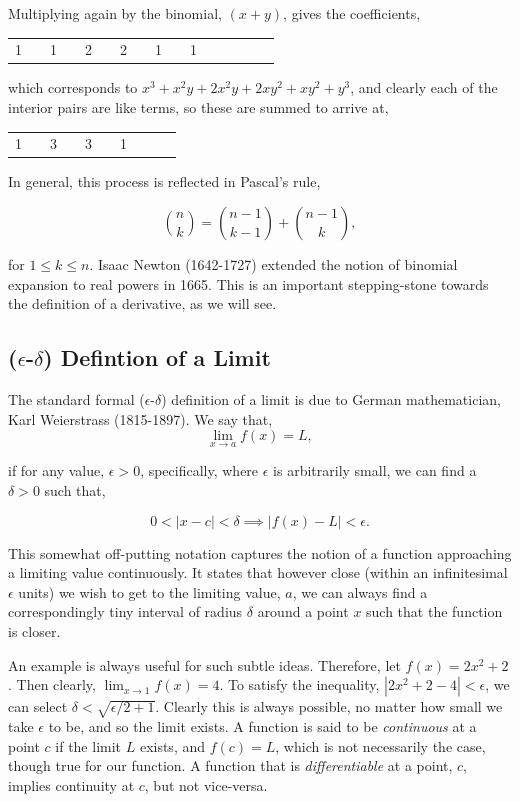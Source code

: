 \documentclass[11pt]{amsart}
\begin{document}
Multiplying again by the binomial, $(x + y)$, gives the coefficients,

\begin{center}
\begin{tabular}{cccccccccccccccc}
1&&1&&2&&2&&1&&1 \\
\end{tabular}
\end{center}

which corresponds to $x^3 + x^2y + 2x^2y + 2xy^2 + xy^2 + y^3$, and clearly each of the interior pairs are like terms, so these are summed to arrive at,

\begin{center}
\begin{tabular}{cccccccccc}
1&&3&&3&&1 \\
\end{tabular}
\end{center}

In general, this process is reflected in Pascal's rule,

$${{n}\choose{k}} = {{n-1}\choose{k-1}} + {{n-1}\choose{k}},$$
		
for $1 \leq k \leq n$. Isaac Newton (1642-1727) extended the notion of binomial expansion to real powers in 1665. This is an important stepping-stone towards the definition of a derivative, as we will see.

\subsection{($\epsilon$-$\delta$) Defintion of a Limit}

The standard formal ($\epsilon$-$\delta$) definition of a limit is due to German mathematician, Karl Weierstrass (1815-1897). We say that, $$\lim_{x \to a} f(x) = L,$$

if for any value, $\epsilon > 0$, specifically, where $\epsilon$ is arbitrarily small, we can find a $\delta > 0$ such that,

$$0 < |x - c| < \delta \implies |f(x) - L| < \epsilon.$$

This somewhat off-putting notation captures the notion of a function approaching a limiting value continuously. It states that however close (within an infinitesimal $\epsilon$ units) we wish to get to the limiting value, $a$, we can always find a correspondingly tiny interval of radius $\delta$ around a point $x$ such that the function is closer.

An example is always useful for such subtle ideas. Therefore, let $f(x) = 2x^2 + 2$. Then clearly, $\lim_{x \to 1} f(x) = 4$. To satisfy the inequality, $|2x^2 + 2 - 4| < \epsilon$, we can select $\delta < \sqrt{\epsilon/2 + 1}$. Clearly this is always possible, no matter how small we take $\epsilon$ to be, and so the limit exists. A function is said to be \emph{continuous} at a point $c$ if the limit $L$ exists, and $f(c) = L$, which is not necessarily the case, though true for our function. A function that is \emph{differentiable} at a point, $c$, implies continuity at $c$, but not vice-versa.
\end{document}

